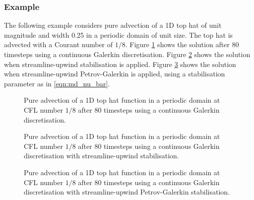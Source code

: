 \subsubsection{Example}

The following example considers pure advection of a 1D top hat of unit magnitude
and width 0.25 in a periodic domain of unit size. The top hat is advected with a
Courant number of $1 / 8$. Figure \ref{fig:top_hat_cg} shows the solution after
80 timesteps using a continuous Galerkin discretisation. Figure \ref{fig:top_hat_su}
shows the solution when streamline-upwind stabilisation is applied.
Figure \ref{fig:top_hat_supg} shows the solution when streamline-upwind
Petrov-Galerkin is applied, using a stabilisation parameter as in \eqref{eqn:md_nu_bar}.

\begin{figure}[ht]
  \centering
  \caption{Pure advection of a 1D top hat function in a periodic domain at CFL number $1 / 8$ after 80 timesteps
           using a continuous Galerkin discretisation.}
  \label{fig:top_hat_cg}
\end{figure}

\begin{figure}[ht]
  \centering
  \caption{Pure advection of a 1D top hat function in a periodic domain at CFL number $1 / 8$ after 80 timesteps
           using a continuous Galerkin discretisation with streamline-upwind
           stabilisation.}
  \label{fig:top_hat_su}
\end{figure}

\begin{figure}[ht]
  \centering
  \caption{Pure advection of a 1D top hat function in a periodic domain at CFL number $1 / 8$ after 80 timesteps
           using a continuous Galerkin discretisation with streamline-upwind
           Petrov-Galerkin stabilisation.}
  \label{fig:top_hat_supg}
\end{figure}

